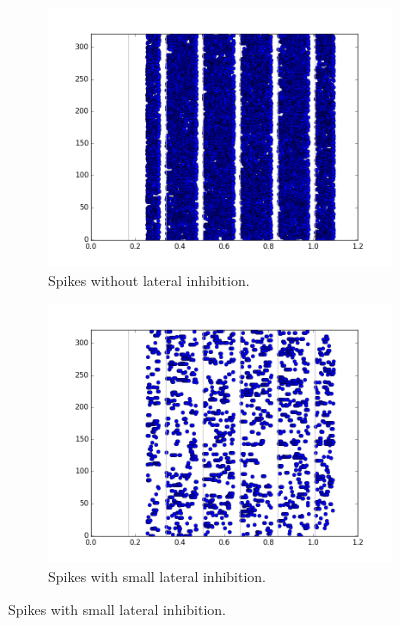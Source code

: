  \begin{figure}[h!]
	\centering
	\begin{subfigure}[t]{.55\textwidth}
  		\centering
  		\includegraphics[width=.9\linewidth]{imgs/app/inhib_no.png}
  		\caption{Spikes without lateral inhibition.}
  		\label{fig:sub1}
	\end{subfigure}%
	
	\begin{subfigure}[t]{.55\textwidth}
  		\centering
  		\includegraphics[width=.9\linewidth]{imgs/app/inhib_small.png}
  		\caption{Spikes with small lateral inhibition.}
  		\label{fig:sub2}
	\end{subfigure}
	

\end{figure}
